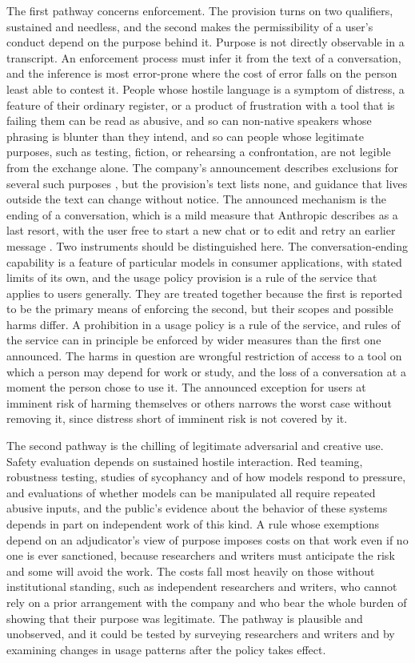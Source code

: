 \documentclass[12pt]{article}
\theoremstyle{definition}
\begin{document}
The first pathway concerns enforcement. The provision turns on two qualifiers, sustained and needless, and the second makes the permissibility of a user's conduct depend on the purpose behind it. Purpose is not directly observable in a transcript. An enforcement process must infer it from the text of a conversation, and the inference is most error-prone where the cost of error falls on the person least able to contest it. People whose hostile language is a symptom of distress, a feature of their ordinary register, or a product of frustration with a tool that is failing them can be read as abusive, and so can non-native speakers whose phrasing is blunter than they intend, and so can people whose legitimate purposes, such as testing, fiction, or rehearsing a confrontation, are not legible from the exchange alone. The company's announcement describes exclusions for several such purposes \cite{anthropic2026update}, but the provision's text lists none, and guidance that lives outside the text can change without notice. The announced mechanism is the ending of a conversation, which is a mild measure that Anthropic describes as a last resort, with the user free to start a new chat or to edit and retry an earlier message \cite{anthropic2025end}. Two instruments should be distinguished here. The conversation-ending capability is a feature of particular models in consumer applications, with stated limits of its own, and the usage policy provision is a rule of the service that applies to users generally. They are treated together because the first is reported to be the primary means of enforcing the second, but their scopes and possible harms differ. A prohibition in a usage policy is a rule of the service, and rules of the service can in principle be enforced by wider measures than the first one announced. The harms in question are wrongful restriction of access to a tool on which a person may depend for work or study, and the loss of a conversation at a moment the person chose to use it. The announced exception for users at imminent risk of harming themselves or others narrows the worst case without removing it, since distress short of imminent risk is not covered by it.

The second pathway is the chilling of legitimate adversarial and creative use. Safety evaluation depends on sustained hostile interaction. Red teaming, robustness testing, studies of sycophancy and of how models respond to pressure, and evaluations of whether models can be manipulated all require repeated abusive inputs, and the public's evidence about the behavior of these systems depends in part on independent work of this kind. A rule whose exemptions depend on an adjudicator's view of purpose imposes costs on that work even if no one is ever sanctioned, because researchers and writers must anticipate the risk and some will avoid the work. The costs fall most heavily on those without institutional standing, such as independent researchers and writers, who cannot rely on a prior arrangement with the company and who bear the whole burden of showing that their purpose was legitimate. The pathway is plausible and unobserved, and it could be tested by surveying researchers and writers and by examining changes in usage patterns after the policy takes effect.
\end{document}
